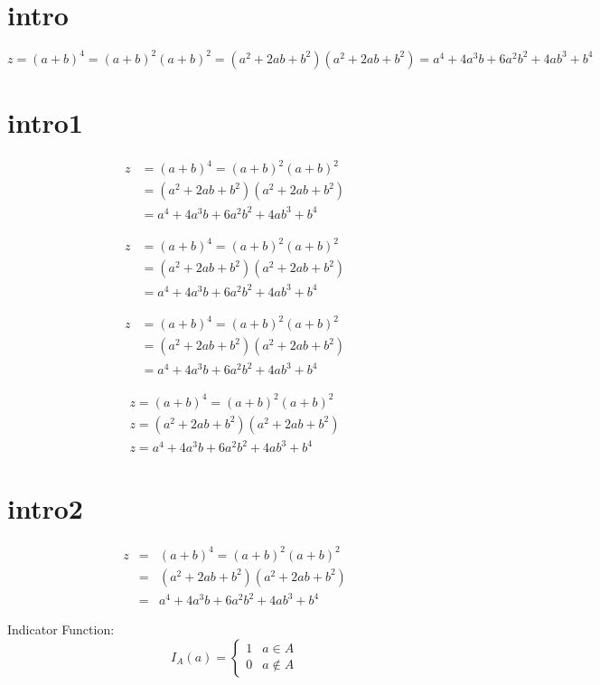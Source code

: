 \documentclass{book}
\numberwithin{equation}{section}  %
\begin{document}
\chapter{intro}
\[z=(a+b)^4=(a+b)^2(a+b)^2=(a^2+2ab+b^2)(a^2+2ab+b^2)=a^4+4a^3b+6a^2b^2+4ab^3+b^4\]
 

\chapter{intro1}
\begin{equation}	%
\begin{split}  %
z&=(a+b)^4=(a+b)^2(a+b)^2  \\
&=(a^2+2ab+b^2)(a^2+2ab+b^2) \\
&=a^4+4a^3b+6a^2b^2+4ab^3+b^4		
\end{split}
\end{equation}	


\begin{align}  %
z&=(a+b)^4=(a+b)^2(a+b)^2  \\ %
&=(a^2+2ab+b^2)(a^2+2ab+b^2) \\
&=a^4+4a^3b+6a^2b^2+4ab^3+b^4		
\end{align}
	
\begin{align}  %
z&=(a+b)^4=(a+b)^2(a+b)^2 \nonumber \\
&=(a^2+2ab+b^2)(a^2+2ab+b^2) \nonumber\\
&=a^4+4a^3b+6a^2b^2+4ab^3+b^4		
\end{align}

\begin{equation}
\begin{gathered}  %
z=(a+b)^4=(a+b)^2(a+b)^2 \\
z=(a^2+2ab+b^2)(a^2+2ab+b^2) \\
z=a^4+4a^3b+6a^2b^2+4ab^3+b^4		
\end{gathered}
\end{equation}

\chapter{intro2}	

\begin{eqnarray}
z&=&(a+b)^4=(a+b)^2(a+b)^2 \nonumber \\
&=&(a^2+2ab+b^2)(a^2+2ab+b^2) \nonumber\\
&=&a^4+4a^3b+6a^2b^2+4ab^3+b^4
\end{eqnarray}

Indicator Function:
\[
I_A(a)=
\begin{cases}
	1&a \in A \\
	0&a \not\in A
\end{cases}
\]
\end{document}
